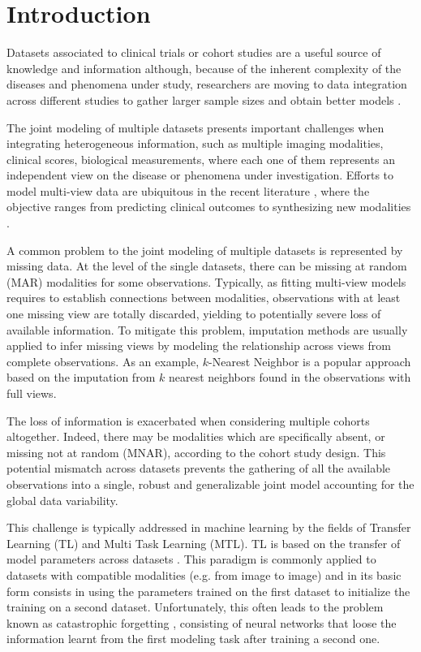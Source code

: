 \section{Introduction}

Datasets associated to clinical trials or cohort studies are a useful source of knowledge and information although, because of the inherent complexity of the diseases and phenomena under study, researchers are moving to data integration across different studies to gather larger sample sizes and obtain better models \citep{LeSueur2020}.

The joint modeling of multiple datasets presents important challenges when integrating heterogeneous information, such as multiple imaging modalities, clinical scores, biological measurements, where each one of them represents an independent view on the disease or phenomena under investigation.
Efforts to model multi-view data are ubiquitous in the recent literature \citep{Vieira2020}, where the objective ranges from predicting clinical outcomes \citep{Chen2019} to synthesizing new modalities \citep{Zhou2020, Wei2019}.

A common problem to the joint modeling of multiple datasets is represented by missing data.
At the level of the single datasets, there can be missing at random (MAR) modalities for some observations.
Typically, as fitting multi-view models requires to establish connections between modalities, observations with at least one missing view are totally discarded, yielding to potentially severe loss of available information.
To mitigate this problem, imputation methods are usually applied to infer missing views by modeling the relationship across views from complete observations.
As an example, $k$-Nearest Neighbor is a popular approach based on the imputation from $k$ nearest neighbors found in the observations with full views.

The loss of information is exacerbated when considering multiple cohorts altogether.
Indeed, there may be modalities which are specifically absent, or missing not at random (MNAR), according to the cohort study design.
This potential mismatch across datasets prevents the gathering of all the available observations into a single, robust and generalizable joint model accounting for the global data variability.

This challenge is typically addressed in machine learning by the fields of Transfer Learning (TL) and Multi Task Learning (MTL).
TL is based on the transfer of model parameters across datasets \citep{TL}.
This paradigm is commonly applied to datasets with compatible modalities (e.g. from image to image) and in its basic form consists in using the parameters trained on the first dataset to initialize the training on a second dataset.
Unfortunately, this often leads to the problem known as catastrophic forgetting \citep{CatastroficForgetting}, consisting of neural networks that loose the information learnt from the first modeling task after training a second one.

